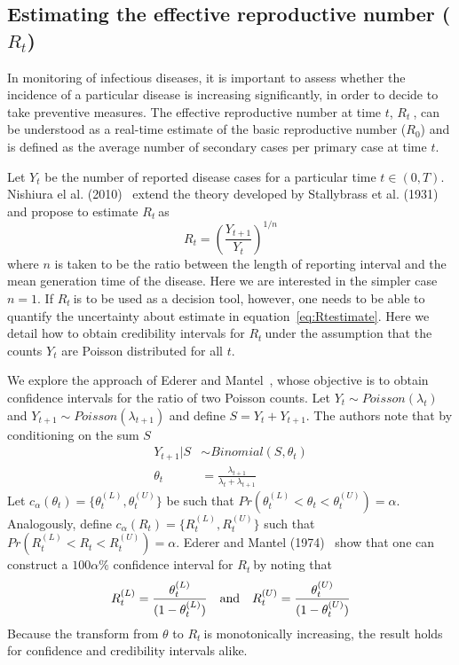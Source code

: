 \documentclass[10pt]{article}
\def \rr {$R_{t}\:$}
\begin{document}
\subsection*{Estimating the effective reproductive number ($R_t$)}

In monitoring of infectious diseases, it is important to assess whether the 
incidence of a  particular disease is increasing significantly, in order to 
decide to take preventive measures.
The effective reproductive number at time $t$, \rr, can be understood as a 
real-time estimate of the basic reproductive number ($R_{0}$) and is defined as 
the average number of secondary cases per primary case at time $t$.

Let $Y_t$ be the number of reported disease cases for a particular time $t \in 
(0, T)$.
Nishiura el al. (2010)~\cite{nishiura} extend the theory developed by 
Stallybrass et al. (1931)~\cite{stallybrass} and propose to estimate \rr as
\begin{equation}
\label{eq:Rtestimate}
R_t = \left( \frac{Y_{t+1}}{Y_t}\right)^{1/n}
\end{equation}
where $n$ is taken to be the ratio between the length of reporting interval and 
the mean generation time of the disease.
Here we are interested in the simpler case $n=1$.
If \rr is to be used as a decision tool, however, one needs to be able to 
quantify the 
uncertainty about estimate in equation~\ref{eq:Rtestimate}. 
Here we detail how to obtain credibility intervals for \rr under the assumption 
that the counts $Y_t$ are Poisson distributed for all $t$.

We explore the approach of Ederer and Mantel~\cite{mantel}, whose objective is 
to obtain 
confidence intervals for the ratio of two Poisson counts. 
Let $Y_{t} \sim Poisson(\lambda_t)$ and $Y_{t+1} \sim Poisson(\lambda_{t+1})$ 
and define $S = Y_{t} + Y_{t+1}$.
The authors note that by conditioning on the sum $S$
\begin{align}
\label{eq:binlike}
Y_{t+1} | S &\sim Binomial(S, \theta_t) \\
\theta_t &= \frac{\lambda_{t+1}}{\lambda_{t} + \lambda_{t+1}}
\end{align}
Let $c_{\alpha}(\theta_t) = \{\theta_t^{(L)} , \theta_t^{(U)} \}$ be such that 
$Pr(\theta_t^{(L)}<\theta_t <\theta_t^{(U)}) = \alpha$.
Analogously, define $c_{\alpha}(R_t) = \{R_t^{(L)} , R_t^{(U)} \}$ such that 
$Pr(R_t^{(L)}<R_t<R_t^{(U)}) = \alpha$.
Ederer and Mantel (1974)~\cite{mantel} show that one can construct a $100\alpha 
\%$ confidence interval for \rr by noting that
\begin{equation}
\label{eq:confRt}
 R_t^{(L)} = \frac{\theta_t^{(L)}}{(1-\theta_t^{(L)})} \quad \text{and} \quad 
R_t^{(U)} = \frac{\theta_t^{(U)}}{(1-\theta_t^{(U)})}\\
\end{equation}
Because the transform from $\theta$ to \rr is monotonically 
increasing, the result holds for confidence and credibility intervals alike.
\end{document}
